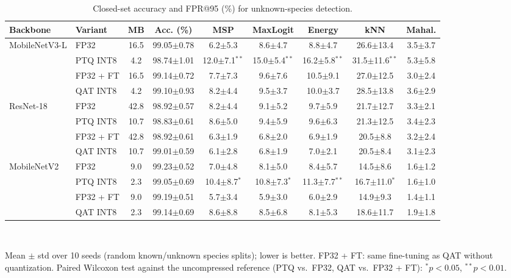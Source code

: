\begin{table}[t]
\centering
\caption{Closed-set accuracy and FPR@95 (\%) for unknown-species detection.}
\label{tab:fpr95}
\setlength{\tabcolsep}{3.5pt}
\footnotesize
\begin{tabular}{llccccccc}
\toprule
Backbone & Variant & MB & Acc. (\%) & MSP & MaxLogit & Energy & kNN & Mahal. \\
\midrule
MobileNetV3-L & FP32 & 16.5 & 99.05$\pm$0.78 & 6.2$\pm$5.3 & 8.6$\pm$4.7 & 8.8$\pm$4.7 & 26.6$\pm$13.4 & 3.5$\pm$3.7 \\
 & PTQ INT8 & 4.2 & 98.74$\pm$1.01 & 12.0$\pm$7.1$^{**}$ & 15.0$\pm$5.4$^{**}$ & 16.2$\pm$5.8$^{**}$ & 31.5$\pm$11.6$^{**}$ & 5.3$\pm$5.8 \\
 & FP32 + FT & 16.5 & 99.14$\pm$0.72 & 7.7$\pm$7.3 & 9.6$\pm$7.6 & 10.5$\pm$9.1 & 27.0$\pm$12.5 & 3.0$\pm$2.4 \\
 & QAT INT8 & 4.2 & 99.10$\pm$0.93 & 8.2$\pm$4.4 & 9.5$\pm$3.7 & 10.0$\pm$3.7 & 28.5$\pm$13.8 & 3.6$\pm$2.9 \\
\midrule
ResNet-18 & FP32 & 42.8 & 98.92$\pm$0.57 & 8.2$\pm$4.4 & 9.1$\pm$5.2 & 9.7$\pm$5.9 & 21.7$\pm$12.7 & 3.3$\pm$2.1 \\
 & PTQ INT8 & 10.7 & 98.83$\pm$0.61 & 8.6$\pm$5.0 & 9.4$\pm$5.9 & 9.6$\pm$6.3 & 21.3$\pm$12.5 & 3.4$\pm$2.3 \\
 & FP32 + FT & 42.8 & 98.92$\pm$0.61 & 6.3$\pm$1.9 & 6.8$\pm$2.0 & 6.9$\pm$1.9 & 20.5$\pm$8.8 & 3.2$\pm$2.4 \\
 & QAT INT8 & 10.7 & 99.01$\pm$0.59 & 6.1$\pm$2.8 & 6.8$\pm$1.9 & 7.0$\pm$2.1 & 20.5$\pm$8.4 & 3.1$\pm$2.3 \\
\midrule
MobileNetV2 & FP32 & 9.0 & 99.23$\pm$0.52 & 7.0$\pm$4.8 & 8.1$\pm$5.0 & 8.4$\pm$5.7 & 14.5$\pm$8.6 & 1.6$\pm$1.2 \\
 & PTQ INT8 & 2.3 & 99.05$\pm$0.69 & 10.4$\pm$8.7$^{*}$ & 10.8$\pm$7.3$^{*}$ & 11.3$\pm$7.7$^{**}$ & 16.7$\pm$11.0$^{*}$ & 1.6$\pm$1.0 \\
 & FP32 + FT & 9.0 & 99.19$\pm$0.51 & 5.7$\pm$3.4 & 5.9$\pm$3.0 & 6.0$\pm$2.9 & 14.9$\pm$9.3 & 1.4$\pm$1.1 \\
 & QAT INT8 & 2.3 & 99.14$\pm$0.69 & 8.6$\pm$8.8 & 8.5$\pm$6.8 & 8.1$\pm$5.3 & 18.6$\pm$11.7 & 1.9$\pm$1.8 \\
\bottomrule
\end{tabular}
\\[2pt]\parbox{\linewidth}{\scriptsize Mean $\pm$ std over 10 seeds (random known/unknown species splits); lower is better. FP32 + FT: same fine-tuning as QAT without quantization. Paired Wilcoxon test against the uncompressed reference (PTQ vs.\ FP32, QAT vs.\ FP32 + FT): $^{*}p<0.05$, $^{**}p<0.01$.}
\end{table}